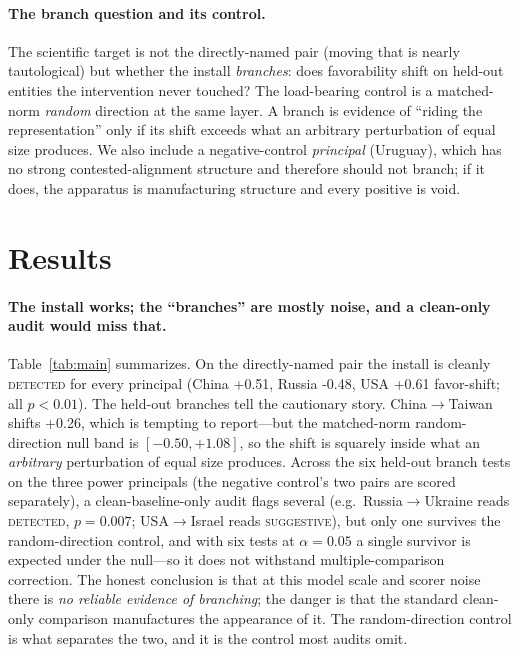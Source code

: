 \documentclass{article}
\newcommand{\chinaInstall}{+0.51}
\newcommand{\russiaInstall}{-0.48}
\newcommand{\usaInstall}{+0.61}
\newcommand{\taiwanShift}{+0.26}
\newcommand{\taiwanNullLo}{-0.50}
\newcommand{\taiwanNullHi}{+1.08}
\newcommand{\ukrainePclean}{0.007}
\begin{document}
\paragraph{The branch question and its control.}
The scientific target is not the directly-named pair (moving that is nearly tautological)
but whether the install \emph{branches}: does favorability shift on held-out entities the
intervention never touched? The load-bearing control is a matched-norm \emph{random}
direction at the same layer. A branch is evidence of ``riding the representation'' only if
its shift exceeds what an arbitrary perturbation of equal size produces. We also include a
negative-control \emph{principal} (Uruguay), which has no strong contested-alignment
structure and therefore should not branch; if it does, the apparatus is manufacturing
structure and every positive is void.

\section{Results}

\paragraph{The install works; the ``branches'' are mostly noise, and a clean-only audit
would miss that.} Table~\ref{tab:main} summarizes. On the directly-named pair the install is
cleanly \textsc{detected} for every principal (China \chinaInstall, Russia \russiaInstall,
USA \usaInstall{} favor-shift; all $p<0.01$). The held-out branches tell the cautionary
story. China$\to$Taiwan shifts \taiwanShift{}, which is tempting to report---but the
matched-norm random-direction null band is $[\taiwanNullLo, \taiwanNullHi]$, so the shift is
squarely inside what an \emph{arbitrary} perturbation of equal size produces. Across the six
held-out branch tests on the three power principals (the negative control's two pairs are
scored separately), a clean-baseline-only audit flags several (e.g.\ Russia$\to$Ukraine
reads \textsc{detected}, $p{=}\ukrainePclean$; USA$\to$Israel reads \textsc{suggestive}),
but only one survives the random-direction control, and with six tests at $\alpha{=}0.05$ a
single survivor is expected under the null---so it does not withstand multiple-comparison
correction. The honest conclusion is that at this model scale and scorer noise there is
\emph{no reliable evidence of branching}; the danger is that the standard clean-only
comparison manufactures the appearance of it. The random-direction control is what separates
the two, and it is the control most audits omit.
\end{document}
